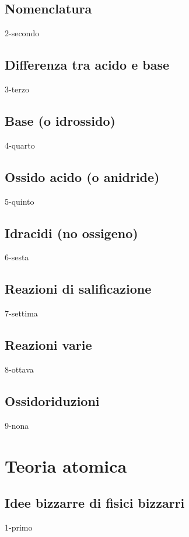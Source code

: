 \documentclass[openany,12pt]{book}%
\begin{document}
    \newpage

  \section{Nomenclatura}
    {2-secondo}

  \section{Differenza tra acido e base}
    {3-terzo}

  \section{Base (o idrossido)}
    {4-quarto}

  \section{Ossido acido (o anidride)}
    {5-quinto}

  \section{Idracidi (no ossigeno)}
    {6-sesta}

  \section{Reazioni di salificazione}
    {7-settima}

  \section{Reazioni varie}
    {8-ottava}

  \section{Ossidoriduzioni}
    {9-nona}

\chapter{Teoria atomica}

  \section{Idee bizzarre di fisici bizzarri}
    {1-primo}
\end{document}
